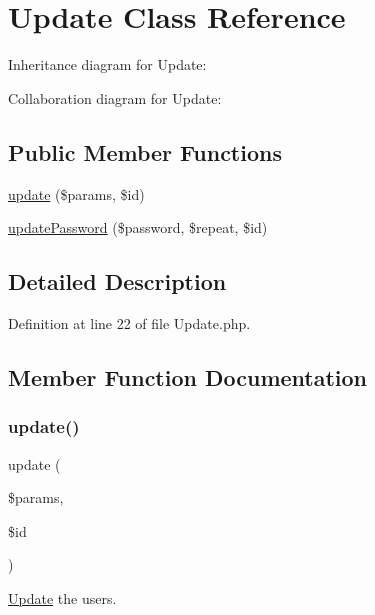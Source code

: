 \hypertarget{class_zest_1_1_auth_1_1_update}{}\section{Update Class Reference}
\label{class_zest_1_1_auth_1_1_update}


Inheritance diagram for Update\+:


Collaboration diagram for Update\+:
\subsection*{Public Member Functions}
\begin{DoxyCompactItemize}
\item 
\mbox{\hyperlink{class_zest_1_1_auth_1_1_update_a13805a530e1b37ab385290a70e779a68}{update}} (\$params, \$id)
\item 
\mbox{\hyperlink{class_zest_1_1_auth_1_1_update_aeca2b4ab2b5298b4c186a17f2e5de52c}{update\+Password}} (\$password, \$repeat, \$id)
\end{DoxyCompactItemize}


\subsection{Detailed Description}


Definition at line 22 of file Update.\+php.



\subsection{Member Function Documentation}
\mbox{\label{class_zest_1_1_auth_1_1_update_a13805a530e1b37ab385290a70e779a68}} 
\subsubsection{\texorpdfstring{update()}{update()}}
{\footnotesize\ttfamily update (\begin{DoxyParamCaption}\item[{}]{\$params,  }\item[{}]{\$id }\end{DoxyParamCaption})}

\mbox{\hyperlink{class_zest_1_1_auth_1_1_update}{Update}} the users.


